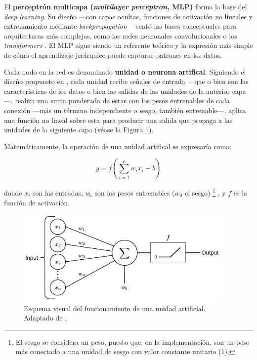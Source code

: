 El \textbf{perceptrón multicapa (\textit{multilayer perceptron}, \acrshort{MLP})} forma la base del \textit{deep learning}. Su diseño ---con capas ocultas, funciones de activación no lineales y entrenamiento  mediante \textit{backpropagation}--- sentó las bases conceptuales para arquitecturas más complejas, como las redes neuronales convolucionales o los \textit{transformers} \cite{murphy2022}. El \acrshort{MLP} sigue siendo un referente teórico y la expresión más simple de cómo el aprendizaje jerárquico puede capturar patrones en los datos. 

Cada nodo en la red es denominado \textbf{unidad o neurona artifical}. Siguiendo el diseño propuesto en \cite{mcculloch1943,rosenblatt1958}, cada unidad recibe señales de entrada ---que o bien son las características de los datos o bien las salidas de las unidades de la anterior capa---, realiza una suma ponderada de estas con los pesos entrenables de cada conexión ---más un término independiente o sesgo, también entrenable---, aplica una función no lineal sobre esta para producir una salida que propaga a las unidades de la siguiente capa (véase la Figura \ref{fig:neuron_MLP}).

Matemáticamente, la operación de una unidad artifical se expresaría como:

$$
y = f \left( \sum_{i=1}^n{w_ix_i+b} \right)
$$

donde $x_i$ son las entradas, $w_i$ son los pesos entrenables ($w_0$ el sesgo)%
\footnote{
    El sesgo se considera un peso, puesto que, en la implementación, son un peso más conectado a una unidad de sesgo con valor constante unitario (1).
}
, y $f$ es la función de activación.

\begin{figure}[htbp]
    \centering
    \includegraphics[width=0.95\textwidth]{capitulos/cap_02/imagenes/Neuron_perceptron.png}
    \caption{
        Esquema visual del funcionamiento de una unidad artificial. Adaptado de 
        \cite{codeworld2022understandingMLDL}.
    } 
    \label{fig:neuron_MLP}
\end{figure}


